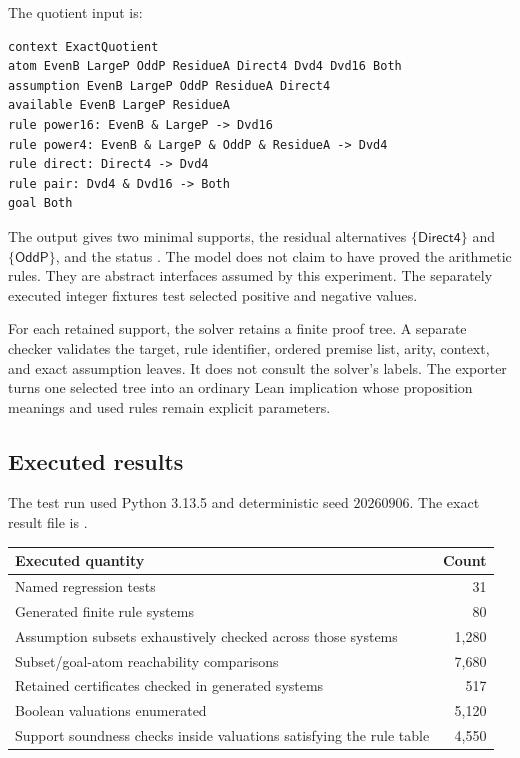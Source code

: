 \documentclass[11pt,a4paper]{article}
\newcommand{\code}[1]{\texttt{\detokenize{#1}}}
\numberwithin{equation}{section}
\theoremstyle{definition}\newtheorem{definition}[theorem]{Definition}
\theoremstyle{remark}\newtheorem{remark}[theorem]{Remark}
\begin{document}
The quotient input is:
\begin{lstlisting}
context ExactQuotient
atom EvenB LargeP OddP ResidueA Direct4 Dvd4 Dvd16 Both
assumption EvenB LargeP OddP ResidueA Direct4
available EvenB LargeP ResidueA
rule power16: EvenB & LargeP -> Dvd16
rule power4: EvenB & LargeP & OddP & ResidueA -> Dvd4
rule direct: Direct4 -> Dvd4
rule pair: Dvd4 & Dvd16 -> Both
goal Both
\end{lstlisting}

The output gives two minimal supports, the residual alternatives
\(\{\mathsf{Direct4}\}\) and \(\{\mathsf{OddP}\}\), and the status
\code{open}. The model does not claim to have proved the arithmetic rules.
They are abstract interfaces assumed by this experiment. The separately
executed integer fixtures test selected positive and negative values.

For each retained support, the solver retains a finite proof tree. A separate
checker validates the target, rule identifier, ordered premise list, arity,
context, and exact assumption leaves. It does not consult the solver's labels.
The exporter turns one selected tree into an ordinary Lean implication whose
proposition meanings and used rules remain explicit parameters.

\subsection{Executed results}
The test run used Python 3.13.5 and deterministic seed \(20260906\).
The exact result file is \code{test_results.json}.
\begin{center}\small
\begin{tabularx}{\textwidth}{@{}Y r@{}}\toprule
Executed quantity & Count\\\midrule
Named regression tests & 31\\
Generated finite rule systems & 80\\
Assumption subsets exhaustively checked across those systems & 1,280\\
Subset/goal-atom reachability comparisons & 7,680\\
Retained certificates checked in generated systems & 517\\
Boolean valuations enumerated & 5,120\\
Support soundness checks inside valuations satisfying the rule table & 4,550\\\bottomrule
\end{tabularx}
\end{center}
\end{document}
